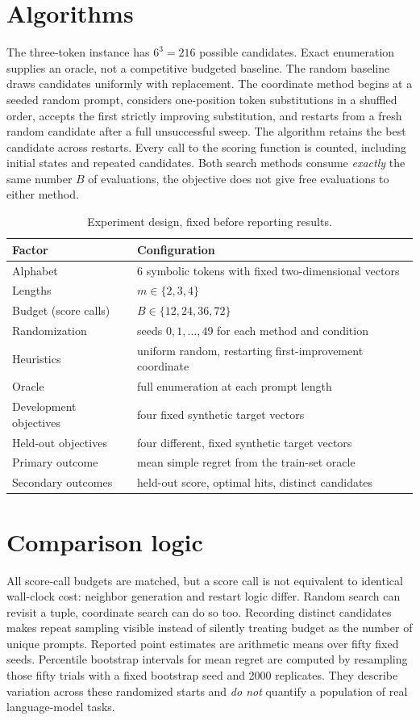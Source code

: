 \documentclass[12pt,a4paper,oneside]{report}
\begin{document}
\section{Algorithms}
The three-token instance has $6^3=216$ possible candidates. Exact enumeration supplies an oracle, not a competitive budgeted baseline. The random baseline draws candidates uniformly with replacement. The coordinate method begins at a seeded random prompt, considers one-position token substitutions in a shuffled order, accepts the first strictly improving substitution, and restarts from a fresh random candidate after a full unsuccessful sweep. The algorithm retains the best candidate across restarts. Every call to the scoring function is counted, including initial states and repeated candidates. Both search methods consume \emph{exactly} the same number $B$ of evaluations, the objective does not give free evaluations to either method.

\begin{table}[htbp]\centering\small
\caption{Experiment design, fixed before reporting results.}\label{tab:design}
\begin{tabular}{ll}\toprule Factor&Configuration\\\midrule Alphabet&6 symbolic tokens with fixed two-dimensional vectors\\
Lengths&$m\in\{2,3,4\}$\\
Budget (score calls)&$B\in\{12,24,36,72\}$\\
Randomization&seeds $0,1,\dots,49$ for each method and condition\\
Heuristics&uniform random, restarting first-improvement coordinate\\
Oracle&full enumeration at each prompt length\\
Development objectives&four fixed synthetic target vectors\\
Held-out objectives&four different, fixed synthetic target vectors\\
Primary outcome&mean simple regret from the train-set oracle\\
Secondary outcomes&held-out score, optimal hits, distinct candidates\\\bottomrule\end{tabular}
\end{table}

\section{Comparison logic}
All score-call budgets are matched, but a score call is not equivalent to identical wall-clock cost: neighbor generation and restart logic differ. Random search can revisit a tuple, coordinate search can do so too. Recording distinct candidates makes repeat sampling visible instead of silently treating budget as the number of unique prompts. Reported point estimates are arithmetic means over fifty fixed seeds. Percentile bootstrap intervals for mean regret are computed by resampling those fifty trials with a fixed bootstrap seed and 2000 replicates. They describe variation across these randomized starts and \emph{do not} quantify a population of real language-model tasks.
\end{document}
